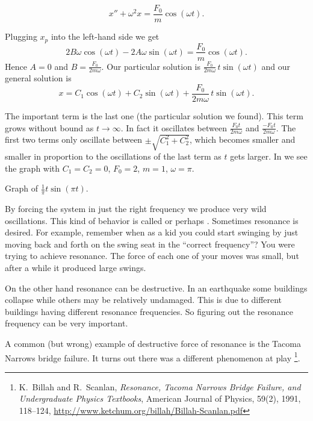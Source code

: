 \documentclass{ximera}
\begin{document}
\begin{equation*}
    x'' + \omega^2 x = \frac{F_0}{m} \cos ( \omega t) .
\end{equation*}

Plugging $x_p$ into the left-hand side we get
\begin{equation*}
    2 B \omega \cos (\omega t) - 2 A \omega \sin (\omega t) = \frac{F_0}{m} \cos (\omega t) .
\end{equation*}
Hence $A = 0$ and $B = \frac{F_0}{2m\omega}$.  Our particular solution is $\frac{F_0}{2m\omega} \, t \sin (\omega t)$ and our general solution is
\begin{equation*}
    x = C_1 \cos (\omega t) + C_2 \sin (\omega t) + \frac{F_0}{2m\omega} \, t \sin (\omega t) .
\end{equation*}

The important term is the last one (the particular solution we found).  This term grows without bound as $t \to \infty$.  In fact it oscillates between $\frac{F_0 t}{2m\omega}$ and $\frac{- F_0 t}{2m\omega}$.  The first two terms only oscillate between $\pm\sqrt{C_1^2 + C_2^2}$, which becomes smaller and smaller in proportion to the oscillations of the last term as $t$ gets larger.  In  we see the graph with $C_1=C_2=0$, $F_0 = 2$, $m=1$, $\omega = \pi$.

\begin{mywrapfig}{3.25in}
    \capstart
    \caption{Graph of $\frac{1}{\pi} t \sin (\pi t)$.\label{3.6:resonancefig}}
\end{mywrapfig}

By forcing the system in just the right frequency we produce very wild oscillations.  This kind of behavior is called \emph{} or perhaps \emph{}.  Sometimes resonance is desired.  For example, remember when as a kid you could start swinging by just moving back and forth on the swing seat in the ``correct frequency''?  You were trying to achieve resonance.  The force of each one of your moves was small, but after a while it produced large swings.

On the other hand resonance can be destructive. In an earthquake some buildings collapse while others may be relatively undamaged.  This is due to different buildings having different resonance frequencies.  So figuring out the resonance frequency can be very important. 

A common (but wrong) example of destructive force of resonance is the Tacoma Narrows bridge failure.  It turns out there was a different phenomenon at play%
\footnote{K.\ Billah and R.\ Scanlan, \emph{Resonance, Tacoma Narrows Bridge Failure, and Undergraduate Physics Textbooks}, American Journal of Physics, 59(2), 1991, 118--124, \url{http://www.ketchum.org/billah/Billah-Scanlan.pdf}}.
\end{document}
